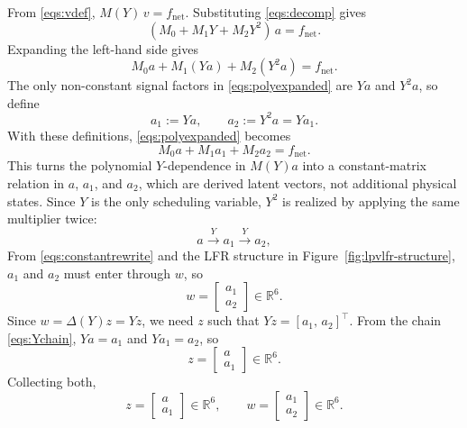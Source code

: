 \documentclass[11pt]{article}
\newcommand{\R}{\mathbb{R}}
\begin{document}
From \eqref{eqs:vdef}, $M(Y)\,v = f_{\mathrm{net}}$. Substituting
\eqref{eqs:decomp} gives
\begin{equation}
    (M_0 + M_1 Y + M_2 Y^2)\,a = f_{\mathrm{net}}.
    \label{eqs:polyinv}
\end{equation}
Expanding the left-hand side gives
\begin{equation}
    M_0 a + M_1(Ya) + M_2(Y^2a) = f_{\mathrm{net}}.
    \label{eqs:polyexpanded}
\end{equation}
The only non-constant signal factors in \eqref{eqs:polyexpanded} are $Ya$ and
$Y^2a$, so define
\begin{equation}
    a_1 := Ya,
    \qquad
    a_2 := Y^2 a = Ya_1.
    \label{eqs:aa1a2}
\end{equation}
With these definitions, \eqref{eqs:polyexpanded} becomes
\begin{equation}
    M_0 a + M_1 a_1 + M_2 a_2 = f_{\mathrm{net}}.
    \label{eqs:constantrewrite}
\end{equation}
This turns the polynomial $Y$-dependence in $M(Y)a$ into a constant-matrix
relation in $a$, $a_1$, and $a_2$, which are derived latent vectors, not
additional physical states. Since $Y$ is the only scheduling variable, $Y^2$ is realized by applying the same multiplier twice:
\begin{equation}
    a \xrightarrow{\,Y\,} a_1 \xrightarrow{\,Y\,} a_2,
\label{eqs:Ychain}
\end{equation}
From \eqref{eqs:constantrewrite} and the LFR structure in Figure~\ref{fig:lpvlfr-structure}, $a_1$ and $a_2$ must enter through $w$, so
\begin{equation}
    w =
    \begin{bmatrix}
        a_1 \\
        a_2
    \end{bmatrix}
    \in \R^6.
\end{equation}
Since $w = \Delta(Y)z = Yz$, we need $z$ such that $Yz = [a_1,\, a_2]^\top$.
From the chain \eqref{eqs:Ychain}, $Ya = a_1$ and $Ya_1 = a_2$, so
\begin{equation}
    z =
    \begin{bmatrix}
        a \\
        a_1
    \end{bmatrix}
    \in \R^6.
\end{equation}
Collecting both,
\begin{equation}
    z =
    \begin{bmatrix}
        a \\
        a_1
    \end{bmatrix}
    \in \R^6,
    \qquad
    w =
    \begin{bmatrix}
        a_1 \\
        a_2
    \end{bmatrix}
    \in \R^6.
    \label{eqs:zw}
\end{equation}
\end{document}
